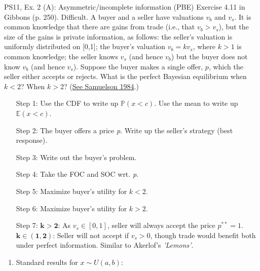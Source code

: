 \begin{frame}{PS11, Ex. 2 (A): Asymmetric/incomplete information (PBE)}
    Exercise 4.11 in Gibbons (p. 250). Difficult. A buyer and a seller have valuations $v_b$ and $v_s$. It is common knowledge that there are gains from trade (i.e., that $v_b > v_s$), but the size of the gains is private information, as follows: the seller’s valuation is uniformly distributed on [0,1]; the buyer’s valuation $v_b = kv_s$, where $k > 1$ is common knowledge; the seller knows $v_s$ (and hence $v_b$) but the buyer does not know $v_b$ (and hence $v_s$). Suppose the buyer makes a single offer, $p$, which the seller either accepts or rejects. What is the perfect Bayesian equilibrium when $k < 2$? When $k > 2$? (\href{https://www.jstor.org/stable/1911195}{See Samuelson 1984}.) \vspace{-9pt}
    \begin{multicols}{2}
      \begin{itemize}
        \item[Step 1:] Use the CDF to write up $\mathbb{P}(x<c)$. Use the mean to write up $\mathbb{E}(x<c)$.
        \item[Step 2:] \vspace{-2pt} The buyer offers a price \textit{p}. Write up the seller's strategy (best response).
        \item[Step 3:] \vspace{-2pt} Write out the buyer's problem.
        \item[Step 4:] \vspace{-2pt} Take the FOC and SOC wrt. \textit{p}.
        \item[Step 5:] \vspace{-2pt} Maximize buyer's utility for $k<2$.
        \item[Step 6:] \vspace{-2pt} Maximize buyer's utility for $k>2$.
        \item[Step 7:] \vspace{-2pt} $\bm{k>2}$: As $v_s\in[0,1]$, seller will always accept the price $p^{**}=1$.\\
        $\bm{k\in(1,2)}$: Seller will not accept if $v_s>0$, though trade would benefit both under perfect information. Similar to Akerlof's \textit{'Lemons'}.
      \end{itemize}
      \vfill\null\columnbreak
      \begin{enumerate}
        \item \vspace{-2pt} Standard results for $x\sim U(a, b):$

\end{enumerate}
\end{multicols}
\end{frame}
